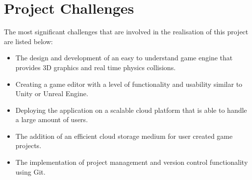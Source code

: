 \section{Project Challenges}
The most significant challenges that are involved in the realisation of this project are listed below:
\begin{itemize}
	\item The design and development of an easy to understand game engine that provides 3D graphics and real time physics collisions.
	\item Creating a game editor with a level of functionality and usability similar to Unity or Unreal Engine.
	\item Deploying the application on a scalable cloud platform that is able to handle a large amount of users.
	\item The addition of an efficient cloud storage medium for user created game projects.
	\item The implementation of project management and version control functionality using Git.
\end{itemize}
